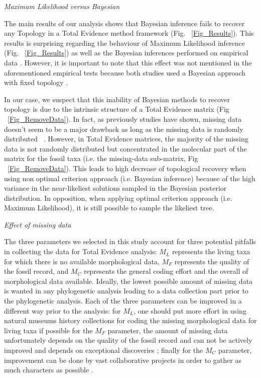 \documentclass[12pt,letterpaper]{article}
\renewcommand{\subsection}[1]{%
\bigskip
\begin{center}
\begin{large}
\normalfont\itshape #1
\end{large}
\end{center}}
\begin{document}
\subsection{Maximum Likelihood versus Bayesian}
The main results of our analysis shows that Bayesian inference fails to recover any Topology in a Total Evidence method framework (Fig. ~\ref{Fig_Results}).
This results is surprising regarding the behaviour of Maximum Likelihood inference (Fig. ~\ref{Fig_Results}) as well as the Bayesian inferences performed on empirical data \citep{ronquista2012,schragocombining2013}.
However, it is important to note that this effect was not mentioned in the aforementioned empirical tests because both studies used a Bayesian approach with fixed topology \citep{ronquista2012,schragocombining2013}.

In our case, we suspect that this inability of Bayesian methods to recover topology is due to the intrinsic structure of a Total Evidence matrix (Fig ~\ref{Fig_RemoveData}).
In fact, as previously studies have shown, missing data doesn't seem to be a major drawback as long as the missing data is randomly distributed ~\citep[e.g.][]{wiensmissing2003,rouresite-specific2011,sansomfossilization2013}.
However, in Total Evidence matrices, the majority of the missing data is not randomly distributed but concentrated in the molecular part of the matrix for the fossil taxa (i.e. the missing-data sub-matrix, Fig ~\ref{Fig_RemoveData}).
This leads to high decrease of topological recovery when using non optimal criterion approach (i.e. Bayesian inference) because of the high variance in the near-likeliest solutions sampled in the Bayesian posterior distribution.
In opposition, when applying optimal criterion approach (i.e. Maximum Likelihood), it is still possible to sample the likeliest tree. %

\subsection{Effect of missing data}
The three parameters we selected in this study account for three potential pitfalls in collecting the data for Total Evidence analysis:
$M_L$ represents the living taxa for which there is no available morphological data,
$M_F$ represents the quality of the fossil record,
and $M_C$ represents the general coding effort and the overall of morphological data available.
Ideally, the lowest possible amount of missing data is wanted in any phylogenetic analysis leading to a data collection part prior to the phylogenetic analysis.
Each of the three parameters can be improved in a different way prior to the analysis:
for $M_L$, one should put more effort in using natural museums history collections for coding the missing morphological data for living taxa if possible %
for the $M_F$ parameter, the amount of missing data unfortunately depends on the quality of the fossil record and can not be actively improved and depends on exceptional discoveries \citep[e.g.][]{nithe2013};
finally for the $M_C$ parameter, improvement can be done by vast collaborative projects in order to gather as much characters as possible \citep[e.g.][]{O'Leary08022013}.
\end{document}
